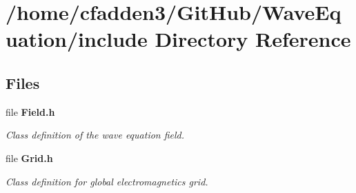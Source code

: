 \section{/home/cfadden3/\+Git\+Hub/\+Wave\+Equation/include Directory Reference}
\label{dir_d44c64559bbebec7f509842c48db8b23}
\subsection*{Files}
\begin{DoxyCompactItemize}
\item 
file {\bf Field.\+h}
\begin{DoxyCompactList}\small\item\em Class definition of the wave equation field. \end{DoxyCompactList}\item 
file {\bf Grid.\+h}
\begin{DoxyCompactList}\small\item\em Class definition for global electromagnetics grid. \end{DoxyCompactList}\end{DoxyCompactItemize}
